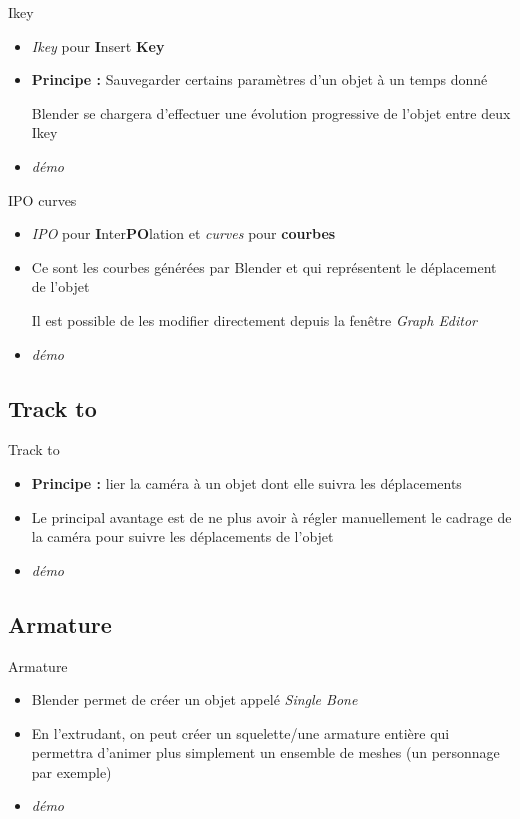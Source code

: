 \documentclass[xcolor=x11names,compress]{beamer}
\renewcommand{\(}{\begin{columns}}
\renewcommand{\)}{\end{columns}}
\newcommand{\<}[1]{\begin{column}{#1}}
\renewcommand{\>}{\end{column}}
\begin{document}
\begin{frame}{Ikey}
\begin{itemize}
    \item \textit{Ikey} pour \textbf{I}nsert \textbf{Key}
    \item \textbf{Principe :} Sauvegarder certains paramètres d'un objet à un temps donné \par
        Blender se chargera d'effectuer une évolution progressive de l'objet entre deux Ikey
    \item \textit{démo}
\end{itemize}
\end{frame}

\begin{frame}{IPO curves}
\begin{itemize}
    \item \textit{IPO} pour \textbf{I}nter\textbf{PO}lation et \textit{curves} pour \textbf{courbes}
    \item Ce sont les courbes générées par Blender et qui représentent le déplacement de l'objet \par
    Il est possible de les modifier directement depuis la fenêtre \textit{Graph Editor}
    \item \textit{démo}
\end{itemize}
\end{frame}

\subsection{Track to}
\begin{frame}{Track to}
\begin{itemize}
    \item \textbf{Principe :} lier la caméra à un objet dont elle suivra les déplacements
    \item Le principal avantage est de ne plus avoir à régler manuellement le cadrage de la caméra pour suivre les déplacements de l'objet
    \item \textit{démo}
\end{itemize}
\end{frame}

\subsection{Armature}
\begin{frame}{Armature}
    \begin{itemize}
        \item Blender permet de créer un objet appelé \textit{Single Bone}
        \item En l'extrudant, on peut créer un squelette/une armature entière qui permettra d'animer plus simplement un ensemble de meshes (un personnage par exemple)
        \item \textit{démo}
    \end{itemize}
\end{frame}
\end{document}
